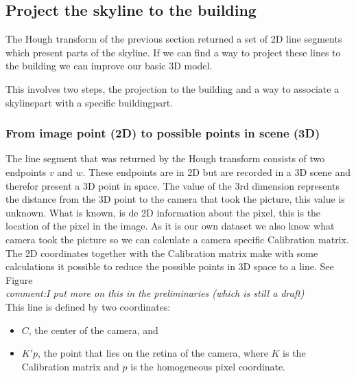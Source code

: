 \subsection{Project the skyline to the building}

	The Hough transform of the previous section returned a set of 2D line
	segments which present parts of the skyline.  If we can find a way to
	project these lines to the building we can improve our basic 3D model.
	
	This involves two steps, the projection to the building and a way to
	associate a skylinepart with a specific buildingpart.


	\subsubsection{From image point (2D) to possible points in scene (3D)} 
	The line segment that was returned by the Hough transform consists of two
	endpoints $v$ and $w$. These endpoints are in 2D but are recorded in a 3D scene
	and therefor present a 3D point in space.
	The value of the 3rd dimension represents the distance from the 3D point to the
	camera that took the picture, this value is unknown.
	What is known, is de 2D information about the pixel, this is the location of the
	pixel in the image. As it is our own dataset we also know what camera took the
	picture so we can calculate a camera specific Calibration matrix. 
	The 2D coordinates together with the Calibration matrix make with some calculations
	it possible to reduce the possible points in 3D space to a line.
	See Figure %
	\\
	\textit{comment:I put more on this in the preliminaries (which is still a draft)}\\

	This line is defined by two coordinates:\\
	\begin{itemize}
		\item $C$, the center of the camera, and
		\item $K'p$, the point that lies on the retina of the camera, where $K$ is the Calibration matrix and $p$ is the homogeneous pixel coordinate.
	\end{itemize}


